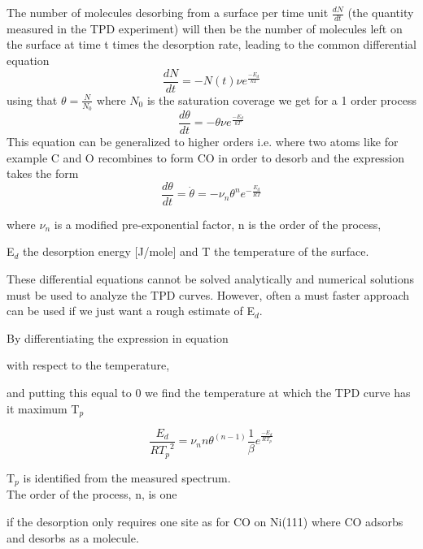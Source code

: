 The number of molecules desorbing from a surface per time unit $\frac{dN}{dt}$ (the quantity measured in the TPD experiment) will then be the number of molecules left on the surface  at time t times the desorption rate,  leading to the common differential equation
\begin{equation}
\frac{dN}{dt} =-N(t)\nu e^{\frac{-E_{d}}{kT}}
\end{equation}
using that $\theta = \frac{N}{N_0}$ where $N_0$ is the saturation coverage we get for a 1 order process
\begin{equation}
\frac{d\theta}{dt} =-\theta \nu e^{\frac{-E_{d}}{kT}}
\end{equation} This equation can be generalized to higher orders i.e. where two atoms like for example C and O recombines to form CO in order to desorb and the expression takes the form
\begin{equation}

\frac{d\theta}{dt} = \dot{\theta} = -{\nu}_n {\theta}^n e^{-\frac{E_d}{RT}}

\end{equation}

where ${\nu}_n$ is a modified pre-exponential factor, n is the order of the process,

E$_d$ the desorption energy [J/mole] and T the temperature of the surface.

These differential equations cannot be solved analytically and numerical solutions must be used to analyze the TPD curves. However, often a must faster approach can be used if we just want a rough estimate of E$_{d}$.

By differentiating the expression in equation  

with respect to the temperature, 

and putting this equal to 0 we find the temperature at which the TPD curve has it maximum T$_p$  

\begin{equation}

\frac{E_d}{R{T_p}^2} = {\nu}_n  n  {\theta}^{(n-1)}  \frac{1}{\beta}  e^{\frac{-E_d}{RT_p}}

\end{equation}

T$_p$ is identified from the measured spectrum.\\

The order of the process, n, is one 

if the desorption only requires one site as for CO on Ni(111) where CO adsorbs and desorbs as a molecule. 

